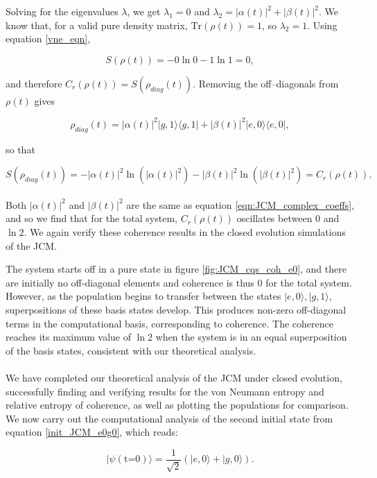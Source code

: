 \documentclass[12pt]{article}
\begin{document}
Solving for the eigenvalues $\lambda$, we get $\lambda_1 = 0$ and $\lambda_2 = |\alpha(t)|^2 + |\beta(t)|^2$. We know that, for a valid pure density matrix, $\text{Tr}(\rho(t)) = 1$, so $\lambda_2 = 1$. Using equation \eqref{vne_eqn},

\begin{equation*}
    S(\rho(t)) = - 0 \ln0 - 1\ln1 = 0, 
\end{equation*}

and therefore $C_r(\rho(t)) = S(\rho_{diag}(t))$. Removing the off--diagonals from $\rho(t)$ gives

\begin{equation*}
    \rho_{diag}(t) = |\alpha(t)|^2|g,1\rangle\langle g,1| + |\beta(t)|^2|e,0\rangle\langle e,0|,
\end{equation*}

so that

\begin{equation*}
    S(\rho_{diag}(t)) = - |\alpha(t)|^2\ln(|\alpha(t)|^2) - |\beta(t)|^2\ln(|\beta(t)|^2) = C_r(\rho(t)).
\end{equation*}
\\
Both $|\alpha(t)|^2$ and $|\beta(t)|^2$ are the same as equation \eqref{eqn:JCM_complex_coeffs}, and so we find that for the total system, $C_r(\rho(t))$
oscillates between $0$ and $\ln2$. We again verify these coherence results in the closed evolution simulations of the JCM.

The system starts off in a pure state in figure \ref{fig:JCM_cqs_coh_e0}, and there are initially no off-diagonal elements and coherence is thus 0 for the total system. However, as the population begins to transfer between the states $|e,0\rangle,|g,1\rangle$, superpositions of these basis states develop. This produces non-zero off-diagonal terms in the computational basis, corresponding to coherence. The coherence reaches its maximum value of $\ln2$ when the system is in an equal superposition of the basis states, consistent with our theoretical analysis. \\
\\
We have completed our theoretical analysis of the JCM under closed evolution, successfully finding and verifying results for the von Neumann entropy and relative entropy of coherence, as well as plotting the populations for comparison. We now carry out the computational analysis of the second initial state from equation \eqref{init_JCM_e0g0}, which reads:

\begin{equation*}
    |\psi (\text{t=0})\rangle = \frac{1}{\sqrt{2}}(|e, 0\rangle + |g,0\rangle).
\end{equation*}
\end{document}
